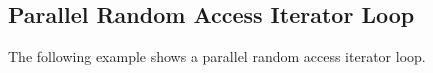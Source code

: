 \begin{cppspecific}[4ex]
\section{Parallel Random Access Iterator Loop}
\label{sec:pra_iterator}

The following example shows a parallel random access iterator loop.

\end{cppspecific}


